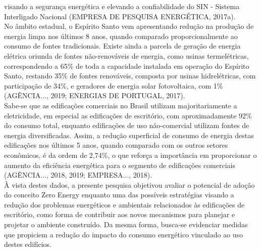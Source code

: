      visando a segurança energética  e  elevando  a  confiabilidade  do  SIN  -  Sistema  Interligado
     Nacional  (EMPRESA  DE PESQUISA ENERGÉTICA, 2017a).\\ No âmbito estadual, o Espírito Santo 
     vem apresentando redução na produção de energia limpa nos últimos 8 anos, quando comparado 
     proporcionalmente ao consumo de fontes tradicionais. Existe ainda a parcela de geração de 
     energia elétrica oriunda de fontes não-renováveis de energia, como usinas termelétricas, 
     correspondendo a 65\% de toda a capacidade instalada em operação do  Espírito  Santo,  
     restando  35\%  de  fontes  renováveis,  composta  por  usinas  hidrelétricas,  com 
     participação  de  34\%,  e  geradores  de  energia  solar  fotovoltaica,  com  1\%  
     (AGÊNCIA...,  2019; ENERGIAS DE PORTUGAL, 2017).\\ Sabe-se  que  as  edificações  comerciais  
     no  Brasil  utilizam  majoritariamente  a  eletricidade,  em especial  as  edificações  de  
     escritório,  com  aproximadamente  92\%  do  consumo  total,  enquanto edificações  de  
     uso  não-comercial  utilizam  fontes  de  energia  diversificadas.  Assim,  a  redução 
     superficial de consumo de energia destas edificações nos últimos 5 anos, quando comparado 
     com os  outros  setores  econômicos,  é  da  ordem  de  2,74\%,  o  que  reforça  a  
     importância  em proporcionar  o  aumento  da  eficiência  energética  para  o  segmento  
     de  edificações  comerciais (AGÊNCIA..., 2018, 2019; EMPRESA..., 2018).\\ À vista  destes  
     dados,  a presente pesquisa objetivou avaliar  o  potencial de adoção  do  conceito Zero  
     Energy   enquanto   uma  das  possíveis   estratégias  visando   a   redução   dos  
     problemas energéticos e ambientais relacionados às edificações de escritório, como forma 
     de contribuir aos novos mecanismos para planejar e projetar o ambiente construído. Da mesma 
     forma, busca-se evidenciar  medidas que propiciem  a  redução  do impacto  do  consumo  
     energético  vinculado  ao uso destes edifícios. 